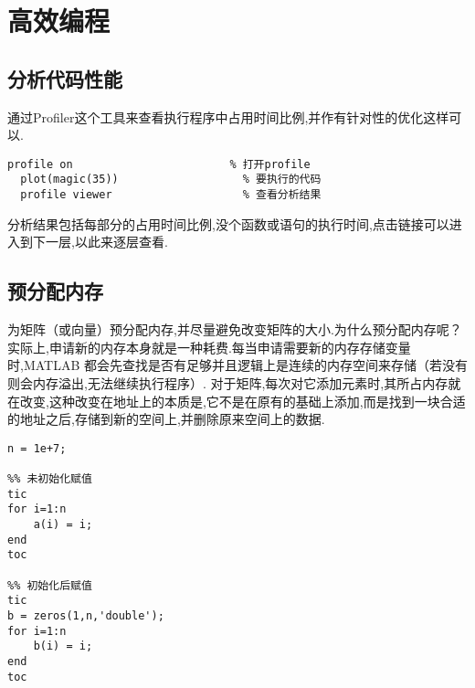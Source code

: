 \section{高效编程}



\subsection{分析代码性能}
 通过Profiler这个工具来查看执行程序中占用时间比例,并作有针对性的优化这样可以.

  \vspace{-0.8cm}
  \begin{lstlisting}[caption = 用Profiler分析代码性能] 
  profile on                        % 打开profile
  plot(magic(35))                   % 要执行的代码
  profile viewer                    % 查看分析结果
  \end{lstlisting}

分析结果包括每部分的占用时间比例,没个函数或语句的执行时间,点击链接可以进入到下一层,以此来逐层查看.





\subsection{预分配内存}
 为矩阵（或向量）预分配内存,并尽量避免改变矩阵的大小.为什么预分配内存呢？实际上,申请新的内存本身就是一种耗费.每当申请需要新的内存存储变量时,MATLAB 都会先查找是否有足够并且逻辑上是连续的内存空间来存储（若没有则会内存溢出,无法继续执行程序）. 对于矩阵,每次对它添加元素时,其所占内存就在改变,这种改变在地址上的本质是,它不是在原有的基础上添加,而是找到一块合适的地址之后,存储到新的空间上,并删除原来空间上的数据.

\vspace{-0.8cm}
\begin{lstlisting}[caption = 是否预分配内存效率对比]
n = 1e+7;

%% 未初始化赋值
tic
for i=1:n
    a(i) = i;
end
toc

%% 初始化后赋值
tic
b = zeros(1,n,'double');
for i=1:n
    b(i) = i;
end
toc
\end{lstlisting}

